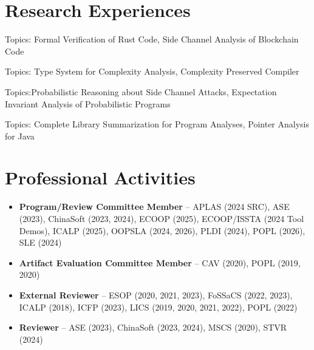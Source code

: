 \documentclass[11pt,letterpaper,sans]{moderncv}        %
\begin{document}
\section{Research Experiences}



  {
  {Topics: Formal Verification of Rust Code, Side Channel Analysis of Blockchain Code}}

  \vspace{4pt}

  {
  {Topics: Type System for Complexity Analysis, Complexity Preserved Compiler}}

  \vspace{4pt}

  {
  {Topics:Probabilistic Reasoning about Side Channel Attacks, Expectation Invariant Analysis of Probabilistic Programs}}

  \vspace{4pt}

  {
  {Topics: Complete Library Summarization for Program Analyses, Pointer Analysis for Java}}

\section{Professional Activities}

\begin{itemize}
  \item \textbf{Program/Review Committee Member} -- APLAS (2024 SRC), ASE (2023), ChinaSoft (2023, 2024), ECOOP (2025), ECOOP/ISSTA (2024 Tool Demos), ICALP (2025), OOPSLA (2024, 2026), PLDI (2024), POPL (2026), SLE (2024)
  \item \textbf{Artifact Evaluation Committee Member} -- CAV (2020), POPL (2019, 2020)
  \item \textbf{External Reviewer} -- ESOP (2020, 2021, 2023), FoSSaCS (2022, 2023), ICALP (2018), ICFP (2023), LICS (2019, 2020, 2021, 2022), POPL (2022)
  \item \textbf{Reviewer} -- ASE (2023), ChinaSoft (2023, 2024), MSCS (2020), STVR (2024)
\end{itemize}
\end{document}
